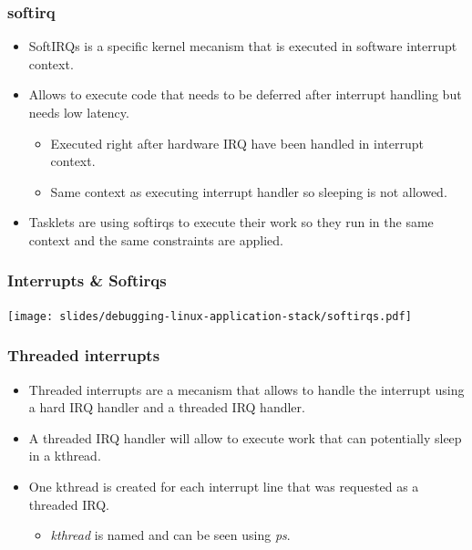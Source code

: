 \begin{frame}
  \frametitle{softirq}
  \begin{itemize}
    \item SoftIRQs is a specific kernel mecanism that is executed in
          software interrupt context.
    \item Allows to execute code that needs to be deferred after interrupt
          handling but needs low latency.
    \begin{itemize}
      \item Executed right after hardware IRQ have been handled in interrupt
            context.
      \item Same context as executing interrupt handler so sleeping is not
            allowed.
    \end{itemize}
    \item Tasklets are using softirqs to execute their work so they run in the
          same context and the same constraints are applied.
  \end{itemize}
\end{frame}

\begin{frame}
  \frametitle{Interrupts \& Softirqs}
  \texttt{[image: slides/debugging-linux-application-stack/softirqs.pdf]}
\end{frame}

\begin{frame}
  \frametitle{Threaded interrupts}
  \begin{itemize}
    \item Threaded interrupts are a mecanism that allows to handle the interrupt
          using a hard IRQ handler and a threaded IRQ handler.
    \item A threaded IRQ handler will allow to execute work that can potentially
          sleep in a kthread.
    \item One kthread is created for each interrupt line that was requested as
          a threaded IRQ.
    \begin{itemize}
      \item {\em kthread} is named  and can be seen using {\em ps}.
    \end{itemize}
  \end{itemize}
\end{frame}

